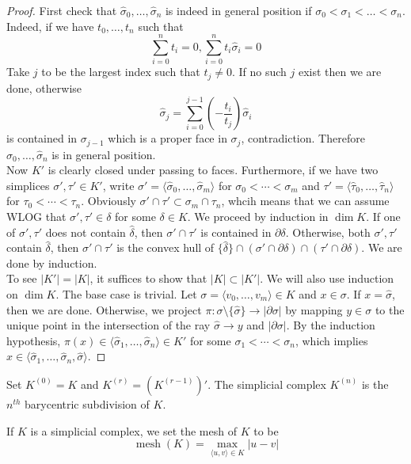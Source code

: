 \begin{proof}
    First check that $\hat\sigma_0,\ldots,\hat\sigma_n$ is indeed in general position if $\sigma_0<\sigma_1<\ldots<\sigma_n$.
    Indeed, if we have $t_0,\ldots,t_n$ such that
    $$\sum_{i=0}^nt_i=0,\sum_{i=0}^nt_i\hat\sigma_i=0$$
    Take $j$ to be the largest index such that $t_j\neq 0$.
    If no such $j$ exist then we are done, otherwise
    $$\hat{\sigma}_j=\sum_{i=0}^{j-1}\left(-\frac{t_i}{t_j}\right)\hat\sigma_i$$
    is contained in $\sigma_{j-1}$ which is a proper face in $\sigma_j$, contradiction.
    Therefore $\hat\sigma_0,\ldots,\hat\sigma_n$ is in general position.\\
    Now $K'$ is clearly closed under passing to faces.
    Furthermore, if we have two simplices $\sigma',\tau'\in K'$, write $\sigma'=\langle\hat\sigma_0,\ldots,\hat\sigma_m\rangle$ for $\sigma_0<\cdots<\sigma_m$ and $\tau'=\langle\hat\tau_0,\ldots,\hat\tau_n\rangle$ for $\tau_0<\cdots<\tau_n$.
    Obviously $\sigma'\cap\tau'\subset \sigma_m\cap\tau_n$, whcih means that we can assume WLOG that $\sigma',\tau'\in\delta$ for some $\delta\in K$.
    We proceed by induction in $\dim K$.
    If one of $\sigma',\tau'$ does not contain $\hat\delta$, then $\sigma'\cap\tau'$ is contained in $\partial\delta$.
    Otherwise, both $\sigma',\tau'$ contain $\hat\delta$, then $\sigma'\cap\tau'$ is the convex hull of $\{\hat\delta\}\cap(\sigma'\cap\partial\delta)\cap(\tau'\cap\partial\delta)$.
    We are done by induction.\\
    To see $|K'|=|K|$, it suffices to show that $|K|\subset |K'|$.
    We will also use induction on $\dim K$.
    The base case is trivial.
    Let $\sigma=\langle v_0,\ldots,v_m\rangle\in K$ and $x\in\sigma$.
    If $x=\hat\sigma$, then we are done.
    Otherwise, we project $\pi:\sigma\setminus\{\hat\sigma\}\to|\partial\sigma|$ by mapping $y\in\sigma$ to the unique point in the intersection of the ray $\hat\sigma\to y$ and $|\partial\sigma|$.
    By the induction hypothesis, $\pi(x)\in\langle\hat\sigma_1,\ldots,\hat\sigma_n\rangle\in K'$ for some $\sigma_1<\cdots<\sigma_n$, which implies $x\in\langle\hat\sigma_1,\ldots,\hat\sigma_n,\hat\sigma\rangle$.
\end{proof}
\begin{definition}
    Set $K^{(0)}=K$ and $K^{(r)}=(K^{(r-1)})'$.
    The simplicial complex $K^{(n)}$ is the $n^{th}$ barycentric subdivision of $K$.
\end{definition}
\begin{definition}
    If $K$ is a simplicial complex, we set the mesh of $K$ to be
    $$\operatorname{mesh}(K)=\max_{\langle u,v\rangle\in K}|u-v|$$
\end{definition}
